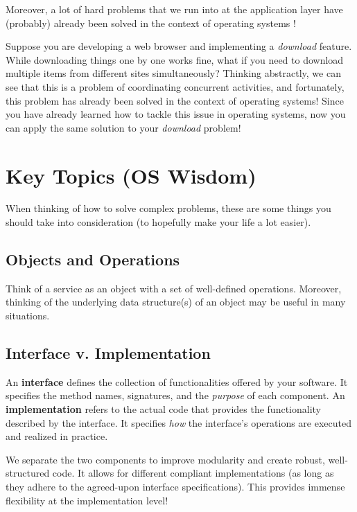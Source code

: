 \documentclass{report}
\begin{document}
Moreover, a lot of hard problems that we run into at the application layer have (probably) already
been solved in the context of operating systems !

\begin{tcolorbox}[colback=blue!5!white,colframe=black!75!blue,title=Example: Difficult Downloads]
  Suppose you are developing a web browser and implementing a \textit{download} feature. While
  downloading things one by one works fine, what if you need to download multiple items from different
  sites simultaneously? Thinking abstractly, we can see that this is a problem of coordinating
  concurrent activities, and fortunately, this problem has already been solved in the context of
  operating systems! Since you have already learned how to tackle this issue in operating systems, now
  you can apply the same solution to your \textit{download} problem!
\end{tcolorbox}





\section{Key Topics (OS Wisdom)}
When thinking of how to solve complex problems, these are some things you should take into
consideration (to hopefully make your life a lot easier).


\subsection*{Objects and Operations}
Think of a service as an object with a set of well-defined operations. Moreover, thinking of the
underlying data structure(s) of an object may be useful in many situations.  


\subsection*{Interface v. Implementation}
\begin{tcolorbox}[title=Definition: Interface and Implementation]
  An \textbf{interface} defines the collection of functionalities offered by your software. It
  specifies the method names, signatures, and the \textit{purpose} of each component. 
  \tcblower
  An \textbf{implementation} refers to the actual code that provides the functionality described by
  the interface. It specifies \textit{how} the interface's operations are executed and realized in practice. 
\end{tcolorbox}
We separate the two components to improve modularity and create robust, well-structured code. It
allows for different compliant implementations (as long as they adhere to the agreed-upon interface
specifications). This provides immense flexibility at the implementation level!
\end{document}
